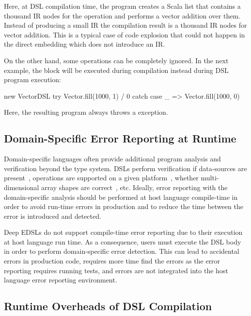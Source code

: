 Here, at DSL compilation time, the program creates a Scala list that contains a thousand
IR nodes for the  operation and performs a vector addition over them.
Instead of producing a small IR the compilation result is a thousand IR nodes for
vector addition. This is a typical case of code explosion that could not happen
in the direct embedding which does not introduce an IR.

On the other hand, some operations can be completely ignored. In the next
example, the  block will be executed during \edsl compilation
instead during DSL program execution:\begin{lstparagraph}
new VectorDSL {
  try Vector.fill(1000, 1) / 0
  catch { case _ => Vector.fill(1000, 0) }
}
\end{lstparagraph}

Here, the resulting program always throws a 
exception.

\subsection{Domain-Specific Error Reporting at Runtime}
\label{sec:domain-specific-error-reporting-runtime}

Domain-specific languages often provide additional program analysis and verification
 beyond the type system. DSLs perform verification if data-sources are present~\cite{mcclure2005sql,zaharia2012resilient}, operations are supported on a given platform~\cite{slick}, whether multi-dimensional array shapes are correct~\cite{ureche_stagedsac:_2012}, etc.
 Ideally, error reporting with the domain-specific analysis should be performed at host language
 compile-time in order to avoid run-time errors in production and to reduce the time between
 the error is introduced and detected.

Deep EDSLs do not support compile-time error reporting due to their execution at host language run time.
 As a consequence, users must execute the DSL body in order to perform domain-specific error detection. This
 can lead to accidental errors in production code, requires more time find the errors as the error reporting
 requires running tests, and errors are not integrated into the host language error
 reporting environment.


\subsection{Runtime Overheads of DSL Compilation}
\label{sec:runtime-overheads}

